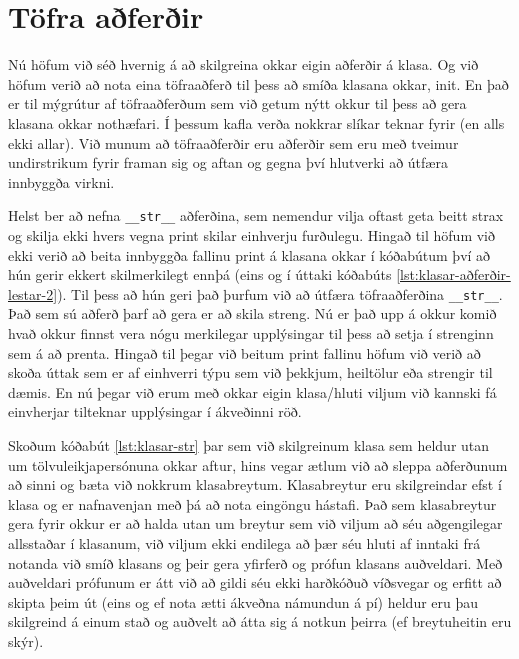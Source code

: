 \section{Töfra aðferðir}\label{uk:klasar-töfra-aðferðir}
Nú höfum við séð hvernig á að skilgreina okkar eigin aðferðir á klasa.
Og við höfum verið að nota eina töfraaðferð til þess að smíða klasana okkar, init.
En það er til mýgrútur af töfraaðferðum sem við getum nýtt okkur til þess að gera klasana okkar nothæfari.
Í þessum kafla verða nokkrar slíkar teknar fyrir (en alls ekki allar).
Við munum að töfraaðferðir eru aðferðir sem eru með tveimur undirstrikum fyrir framan sig og aftan og gegna því hlutverki að útfæra innbyggða virkni.

Helst ber að nefna \texttt{\_\_str\_\_} aðferðina, sem nemendur vilja oftast geta beitt strax og skilja ekki hvers vegna print skilar einhverju furðulegu.
Hingað til höfum við ekki verið að beita innbyggða fallinu print á klasana okkar í kóðabútum því að hún gerir ekkert skilmerkilegt ennþá (eins og í úttaki kóðabúts \ref{lst:klasar-aðferðir-lestar-2}).
Til þess að hún geri það þurfum við að útfæra töfraaðferðina \texttt{\_\_str\_\_}.
Það sem sú aðferð þarf að gera er að skila streng.
Nú er það upp á okkur komið hvað okkur finnst vera nógu merkilegar upplýsingar til þess að setja í strenginn sem á að prenta.
Hingað til þegar við beitum print fallinu höfum við verið að skoða úttak sem er af einhverri týpu sem við þekkjum, heiltölur eða strengir til dæmis.
En nú þegar við erum með okkar eigin klasa/hluti viljum við kannski fá einvherjar tilteknar upplýsingar í ákveðinni röð.

Skoðum kóðabút \ref{lst:klasar-str} þar sem við skilgreinum klasa sem heldur utan um tölvuleikjapersónuna okkar aftur, hins vegar ætlum við að sleppa aðferðunum að sinni og bæta við nokkrum klasabreytum.
Klasabreytur eru skilgreindar efst í klasa og er nafnavenjan með þá að nota eingöngu hástafi.
Það sem klasabreytur gera fyrir okkur er að halda utan um breytur sem við viljum að séu aðgengilegar allsstaðar í klasanum, við viljum ekki endilega að þær séu hluti af inntaki frá notanda við smíð klasans og þeir gera yfirferð og prófun klasans auðveldari.
Með auðveldari prófunum er átt við að gildi séu ekki harðkóðuð víðsvegar og erfitt að skipta þeim út (eins og ef nota ætti ákveðna námundun á pí) heldur eru þau skilgreind á einum stað og auðvelt að átta sig á notkun þeirra (ef breytuheitin eru skýr).

